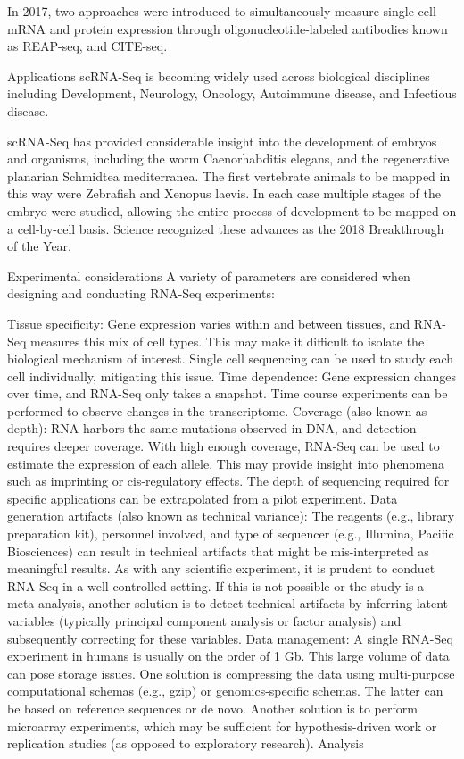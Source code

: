 In 2017, two approaches were introduced to simultaneously measure single-cell mRNA and protein expression through oligonucleotide-labeled antibodies known as REAP-seq, and CITE-seq.

Applications
scRNA-Seq is becoming widely used across biological disciplines including Development, Neurology, Oncology, Autoimmune disease, and Infectious disease.

scRNA-Seq has provided considerable insight into the development of embryos and organisms, including the worm Caenorhabditis elegans, and the regenerative planarian Schmidtea mediterranea. The first vertebrate animals to be mapped in this way were Zebrafish and Xenopus laevis. In each case multiple stages of the embryo were studied, allowing the entire process of development to be mapped on a cell-by-cell basis. Science recognized these advances as the 2018 Breakthrough of the Year.

Experimental considerations
A variety of parameters are considered when designing and conducting RNA-Seq experiments:

Tissue specificity: Gene expression varies within and between tissues, and RNA-Seq measures this mix of cell types. This may make it difficult to isolate the biological mechanism of interest. Single cell sequencing can be used to study each cell individually, mitigating this issue.
Time dependence: Gene expression changes over time, and RNA-Seq only takes a snapshot. Time course experiments can be performed to observe changes in the transcriptome.
Coverage (also known as depth): RNA harbors the same mutations observed in DNA, and detection requires deeper coverage. With high enough coverage, RNA-Seq can be used to estimate the expression of each allele. This may provide insight into phenomena such as imprinting or cis-regulatory effects. The depth of sequencing required for specific applications can be extrapolated from a pilot experiment.
Data generation artifacts (also known as technical variance): The reagents (e.g., library preparation kit), personnel involved, and type of sequencer (e.g., Illumina, Pacific Biosciences) can result in technical artifacts that might be mis-interpreted as meaningful results. As with any scientific experiment, it is prudent to conduct RNA-Seq in a well controlled setting. If this is not possible or the study is a meta-analysis, another solution is to detect technical artifacts by inferring latent variables (typically principal component analysis or factor analysis) and subsequently correcting for these variables.
Data management: A single RNA-Seq experiment in humans is usually on the order of 1 Gb. This large volume of data can pose storage issues. One solution is compressing the data using multi-purpose computational schemas (e.g., gzip) or genomics-specific schemas. The latter can be based on reference sequences or de novo. Another solution is to perform microarray experiments, which may be sufficient for hypothesis-driven work or replication studies (as opposed to exploratory research).
Analysis


